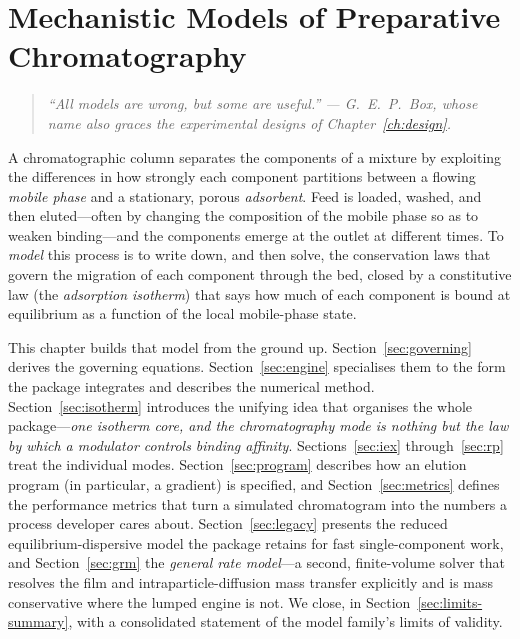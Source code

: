 \chapter{Mechanistic Models of Preparative Chromatography}
\label{ch:models}

\begin{quote}\itshape
``All models are wrong, but some are useful.'' --- G.~E.~P.~Box, whose name also
graces the experimental designs of Chapter~\ref{ch:design}.
\end{quote}

\noindent
A chromatographic column separates the components of a mixture by exploiting the
differences in how strongly each component partitions between a flowing
\emph{mobile phase} and a stationary, porous \emph{adsorbent}. Feed is loaded,
washed, and then eluted---often by changing the composition of the mobile phase
so as to weaken binding---and the components emerge at the outlet at different
times. To \emph{model} this process is to write down, and then solve, the
conservation laws that govern the migration of each component through the bed,
closed by a constitutive law (the \emph{adsorption isotherm}) that says how much
of each component is bound at equilibrium as a function of the local mobile-phase
state.

This chapter builds that model from the ground up. Section~\ref{sec:governing}
derives the governing equations. Section~\ref{sec:engine} specialises them to the
form the package integrates and describes the numerical method.
Section~\ref{sec:isotherm} introduces the unifying idea that organises the whole
package---\emph{one isotherm core, and the chromatography mode is nothing but the
law by which a modulator controls binding affinity}. Sections~\ref{sec:iex}
through~\ref{sec:rp} treat the individual modes. Section~\ref{sec:program}
describes how an elution program (in particular, a gradient) is specified, and
Section~\ref{sec:metrics} defines the performance metrics that turn a simulated
chromatogram into the numbers a process developer cares about.
Section~\ref{sec:legacy} presents the reduced equilibrium-dispersive model the
package retains for fast single-component work, and Section~\ref{sec:grm} the
\emph{general rate model}---a second, finite-volume solver that resolves the
film and intraparticle-diffusion mass transfer explicitly and is mass
conservative where the lumped engine is not. We close, in
Section~\ref{sec:limits-summary}, with a consolidated statement of the model
family's limits of validity.

